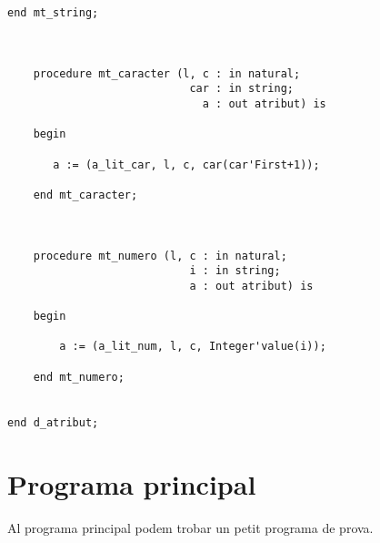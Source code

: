 \documentclass[10pt]{report}
\begin{document}
\begin{lstlisting}[style=Ada]
    end mt_string;
    
    

    procedure mt_caracter (l, c : in natural; 
                            car : in string; 
                              a : out atribut) is
    
    begin
    
       a := (a_lit_car, l, c, car(car'First+1));
       
    end mt_caracter;
        
        
        
    procedure mt_numero (l, c : in natural; 
                            i : in string; 
                            a : out atribut) is
    
    begin
    
        a := (a_lit_num, l, c, Integer'value(i));
        
    end mt_numero;
    

end d_atribut;
    \end{lstlisting}
    \newpage
    
    
    \chapter{Programa principal}
        Al programa principal podem trobar un petit programa de prova.
    \\
        
\end{document}
